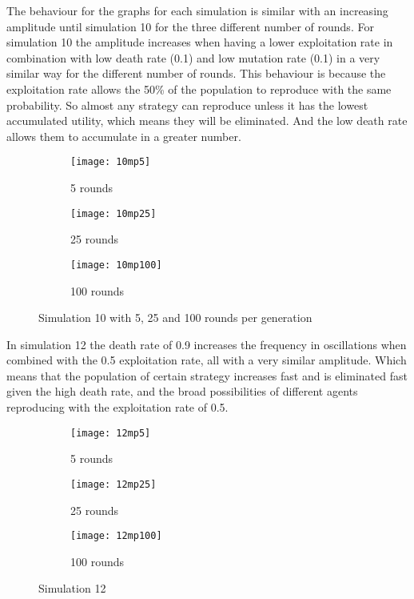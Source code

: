 The behaviour for the graphs for each simulation is similar with an increasing amplitude until simulation 10 for the three different number of rounds. For simulation 10 the amplitude increases when having a lower exploitation rate in combination with low death rate (0.1) and low mutation rate (0.1) in a very similar way for the different number of rounds. This behaviour is because the exploitation rate allows the 50\% of the population to reproduce with the same probability. So almost any strategy can reproduce unless it has the lowest accumulated utility, which means they will be eliminated. And the low death rate allows them to accumulate in a greater number.

\begin{figure}[H]       
    \centering
    \begin{subfigure}[b]{0.3\textwidth}
	\centering
	{\texttt{[image: 10mp5]}}   
    	\caption{5 rounds}
	\label{fig:mpsim105}
    \end{subfigure}
    \hfill
    \begin{subfigure}[b]{0.3\textwidth}
	\centering
	{\texttt{[image: 10mp25]}}   
    	\caption{25 rounds}
	\label{fig:mpsim1025}
    \end{subfigure}
    \hfill
    \begin{subfigure}[b]{0.3\textwidth}
	\centering
	{\texttt{[image: 10mp100]}}   
    	\caption{100 rounds}
	\label{fig:mpsim101000}
    \end{subfigure}
    \caption{Simulation 10 with 5, 25 and 100 rounds per generation}
    \label{mpsim10simulations}
\end{figure}


In simulation 12  the death rate of 0.9 increases the frequency in oscillations when combined with the 0.5 exploitation rate, all with a very similar amplitude. Which means that the population of certain strategy increases fast and is eliminated fast given the high death rate, and the broad possibilities of different agents reproducing with the exploitation rate of 0.5.

\begin{figure}[H]       
    \centering
    \begin{subfigure}[b]{0.3\textwidth}
	\centering
	{\texttt{[image: 12mp5]}}   
    	\caption{5 rounds}
	\label{fig:mpsim125}
    \end{subfigure}
    \hfill
    \begin{subfigure}[b]{0.3\textwidth}
	\centering
	{\texttt{[image: 12mp25]}}   
    	\caption{25 rounds}
	\label{fig:mpsim1225}
    \end{subfigure}
    \hfill
    \begin{subfigure}[b]{0.3\textwidth}
	\centering
	{\texttt{[image: 12mp100]}}   
    	\caption{100 rounds}
	\label{fig:mpsim12100}
    \end{subfigure}
    \caption{Simulation 12}
    \label{mpsim12simulations}
\end{figure}

